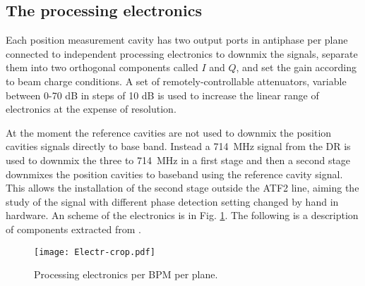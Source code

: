 \subsection{The processing electronics}\label{s:processing}
Each position measurement cavity has two output ports in antiphase per plane connected to independent processing electronics  to downmix the signals, separate them into two orthogonal components called $I$ and $Q$, and set the gain according to beam charge conditions. A set of remotely-controllable attenuators, variable between 0-70 dB in steps of 10 dB is used to increase the linear range of electronics at the expense of resolution.\par
At the moment the reference cavities are not used to downmix the position cavities signals directly to base band. Instead a 714~MHz signal from the DR is used to downmix the three to 714~MHz in a first stage and then a second stage downmixes the position cavities to baseband using the reference cavity signal. This allows the installation of the second stage outside the ATF2 line, aiming the study of the signal with different phase detection setting changed by hand in hardware. An scheme of the electronics is in Fig. \ref{f:elect}. The following is a description of components extracted from \cite{Nakathese}.\par
\begin{figure}[htb]
 \centering\hspace*{-1cm}
 \texttt{[image: Electr-crop.pdf]}\caption{Processing electronics per BPM per plane.}\label{f:elect}
\end{figure}
